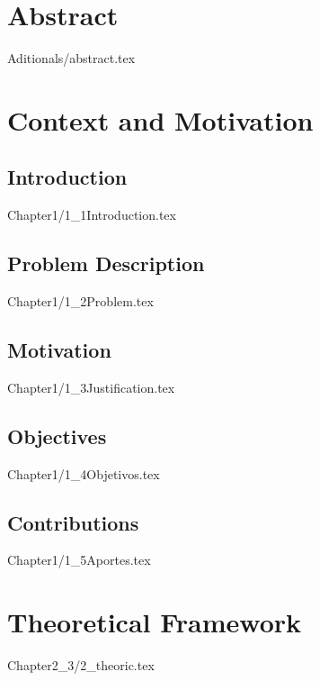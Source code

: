 \documentclass{report}
\begin{document}

\chapter*{Abstract}
{Aditionals/abstract.tex}

\tableofcontents

\chapter{Context and Motivation}

\section{Introduction}
{Chapter1/1_1Introduction.tex}

\section{Problem Description}
{Chapter1/1_2Problem.tex}

\section{Motivation}
{Chapter1/1_3Justification.tex}

\section{Objectives}
{Chapter1/1_4Objetivos.tex}

\section{Contributions}
{Chapter1/1_5Aportes.tex}


\chapter{Theoretical Framework}
{Chapter2_3/2_theoric.tex}
\end{document}
